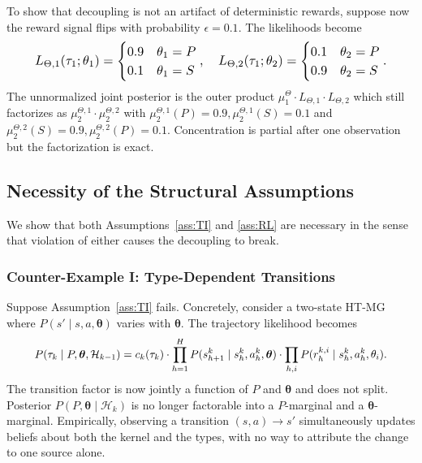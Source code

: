 To show that decoupling is not an artifact of deterministic rewards, suppose now the reward signal flips with probability $\epsilon = 0.1$. The likelihoods become
\begin{equation}\resizebox{0.9\linewidth}{!}{$\displaystyle L_{\Theta,1}(\tau_1; \theta_1) = \begin{cases} 0.9 & \theta_1 = P \\ 0.1 & \theta_1 = S \end{cases}, \quad
L_{\Theta,2}(\tau_1; \theta_2) = \begin{cases} 0.1 & \theta_2 = P \\ 0.9 & \theta_2 = S \end{cases}. $}\end{equation}
The unnormalized joint posterior is the outer product $\mu_1^\Theta \cdot L_{\Theta,1} \cdot L_{\Theta,2}$ which still factorizes as $\mu_2^{\Theta,1} \cdot \mu_2^{\Theta,2}$ with $\mu_2^{\Theta,1}(P) = 0.9, \mu_2^{\Theta,1}(S) = 0.1$ and $\mu_2^{\Theta,2}(S) = 0.9, \mu_2^{\Theta,2}(P) = 0.1$. Concentration is partial after one observation but the factorization is exact.

\subsection{Necessity of the Structural Assumptions}
\label{sec:necessity}

We show that both Assumptions~\ref{ass:TI} and \ref{ass:RL} are necessary in the sense that violation of either causes the decoupling to break.

\subsubsection{Counter-Example I: Type-Dependent Transitions}

Suppose Assumption~\ref{ass:TI} fails. Concretely, consider a two-state HT-MG where $P(s' \mid s, a, \boldsymbol{\theta})$ varies with $\boldsymbol{\theta}$. The trajectory likelihood becomes
\begin{equation}\resizebox{0.9\linewidth}{!}{$\displaystyle P(\tau_k \mid P, \boldsymbol{\theta}, \mathcal{H}_{k-1}) = c_k(\tau_k) \cdot \prod_{h=1}^H P(s_{h+1}^k \mid s_h^k, a_h^k, \boldsymbol{\theta}) \cdot \prod_{h, i} P(r_h^{k,i} \mid s_h^k, a_h^k, \theta_i). $}\end{equation}
The transition factor is now jointly a function of $P$ and $\boldsymbol{\theta}$ and does not split. Posterior $P(P, \boldsymbol{\theta} \mid \mathcal{H}_k)$ is no longer factorable into a $P$-marginal and a $\boldsymbol{\theta}$-marginal. Empirically, observing a transition $(s, a) \to s'$ simultaneously updates beliefs about both the kernel and the types, with no way to attribute the change to one source alone.

